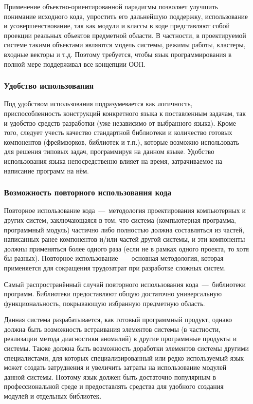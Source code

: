 Применение объектно-ориентированной парадигмы позволяет улучшить понимание исходного кода, упростить его дальнейшую поддержку, использование и усовершенствование, так как модули и классы в коде представляют собой проекции реальных объектов предметной области. В частности, в проектируемой системе такими объектами являются модель системы, режимы работы, кластеры, входные векторы и т.д. Поэтому требуется, чтобы язык программирования в полной мере поддерживал все концепции ООП.

\subsubsection{Удобство использования}
Под удобством использования подразумевается как логичность, приспособленность конструкций конкретного языка к поставленным задачам, так и удобство средств разработки (уже независимо от выбранного языка). Кроме того, следует учесть качество стандартной библиотеки и количество готовых компонентов (фреймворков, библиотек и т.п.), которые возможно использовать для решения типовых задач, программируя на данном языке. Удобство использования языка непосредственно влияет на время, затрачиваемое на написание программ на нём.

\subsubsection{Возможность повторного использования кода}
Повторное использование кода~---~методология проектирования компьютерных и других систем, заключающаяся в том, что система (компьютерная программа, программный модуль) частично либо полностью должна составляться из частей, написанных ранее компонентов и/или частей другой системы, и эти компоненты должны применяться более одного раза (если не в рамках одного проекта, то хотя бы разных). Повторное использование~---~основная методология, которая применяется для сокращения трудозатрат при разработке сложных систем.

Самый распространённый случай повторного использования кода~---~библиотеки программ. Библиотеки предоставляют общую достаточно универсальную функциональность, покрывающую избранную предметную область.

Данная система разрабатывается, как готовый программный продукт, однако должна быть возможность встраивания элементов системы (в частности, реализации метода диагностики аномалий) в другие программные продукты и системы. Также должна быть возможность доработки элементов системы другими специалистами, для которых специализированный или редко используемый язык может создать затруднения и увеличить затраты на использование модулей данной системы. Поэтому язык должен быть достаточно популярным в профессиональной среде и предоставлять средства для удобного создания модулей и отдельных библиотек.

